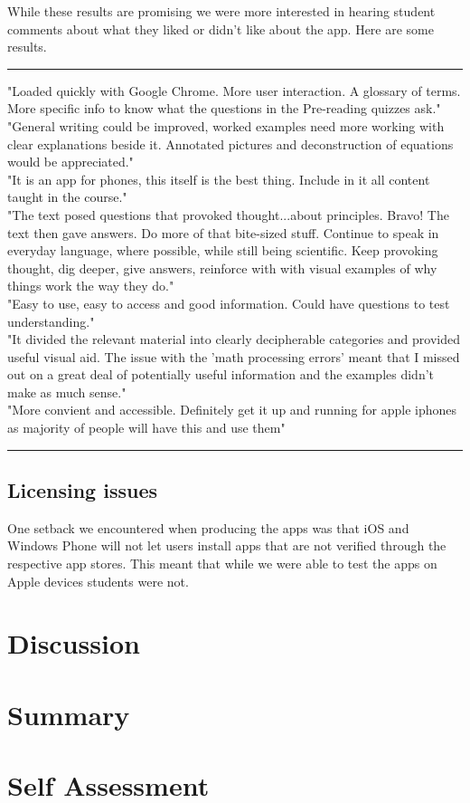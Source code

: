 \documentclass[12pt,a4paper]{article}  %
\begin{document}
While these results are promising we were more interested in hearing student comments about what they liked or didn't like about the app. Here are some results.

\rule[0.5ex]{1\columnwidth}{1pt}
"Loaded quickly with Google Chrome. More user interaction. A glossary of terms. More specific info to know what the questions in the Pre-reading quizzes ask."
\\[3mm]
"General writing could be improved, worked examples need more working with clear explanations beside it. Annotated pictures and deconstruction of equations would be appreciated."
\\[3mm]
"It is an app for phones, this itself is the best thing. Include in it all content taught in the course."
\\[3mm]
"The text posed questions that provoked thought...about principles. Bravo! The text then gave answers. Do more of that bite-sized stuff. Continue to speak in everyday language, where possible, while still being scientific. Keep provoking thought, dig deeper, give answers, reinforce with with visual examples of why things work the way they do."
\\[3mm]
"Easy to use, easy to access and good information. Could have questions to test understanding."
\\[3mm]
"It divided the relevant material into clearly decipherable categories and provided useful visual aid. The issue with the 'math processing errors' meant that I missed out on a great deal of potentially useful information and the examples didn't make as much sense."
\\[3mm]
"More convient and accessible. Definitely get it up and running for apple iphones as majority of people will have this and use them" \\
\rule[0.5ex]{1\columnwidth}{1pt}

\subsection{Licensing issues}

One setback we encountered when producing the apps was that iOS and Windows Phone will not let users install apps that are not verified through the respective app stores. This meant that while we were able to test the apps on Apple devices students were not.


\section{Discussion}

\section{Summary}

\section{Self Assessment}



\end{document}
